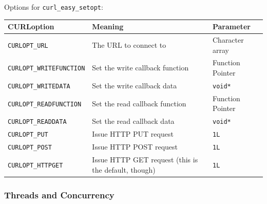\documentclass[legalpaper,10pt]{article}
\begin{document}
\vspace{-1em}
Options for \texttt{curl\_easy\_setopt}:\\
\begin{tabular}{l|l|l}
	\textbf{CURLoption} & \textbf{Meaning} & \textbf{Parameter} \\ \hline
	\texttt{CURLOPT\_URL} & The URL to connect to & Character array \\ \hline
	\texttt{CURLOPT\_WRITEFUNCTION} & Set the write callback function & Function Pointer \\ \hline
	\texttt{CURLOPT\_WRITEDATA} & Set the write callback data & \texttt{void*} \\ \hline
	\texttt{CURLOPT\_READFUNCTION} & Set the read callback function & Function Pointer \\ \hline
	\texttt{CURLOPT\_READDATA} & Set the read callback data & \texttt{void*} \\ \hline
	\texttt{CURLOPT\_PUT} & Issue HTTP PUT request & \texttt{1L}\\ \hline
	\texttt{CURLOPT\_POST} & Issue HTTP POST request & \texttt{1L}\\ \hline
	\texttt{CURLOPT\_HTTPGET} & Issue HTTP GET request (this is the default, though) & \texttt{1L}\\ 
\end{tabular}

\newpage
\subsubsection*{Threads and Concurrency}
\end{document}

